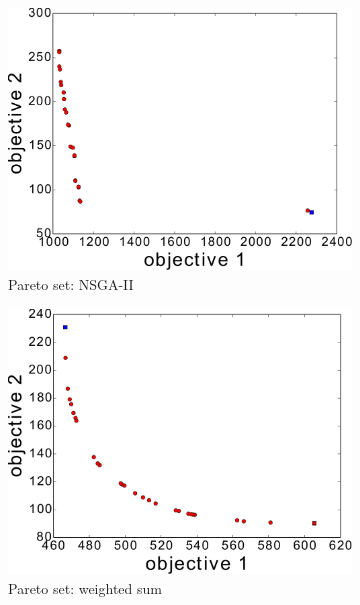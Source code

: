 \documentclass{article}
\begin{document}
\begin{figure}[h!]
\begin{subfigure}[b]{0.31\linewidth}
		\includegraphics[width=\textwidth]{fig/sim3-2obj/PF03-MOPATH.pdf}
		\caption{Pareto set: NSGA-II}
		\label{fig:sim:norm:pf:a}
	\end{subfigure}
	\begin{subfigure}[b]{0.31\linewidth}
		\centering
		\includegraphics[width=\textwidth]{fig/sim1-2obj/PF01-MORRT.pdf}
		\caption{Pareto set: weighted sum}
		\label{fig:sim:norm:pf:b}
	\end{subfigure}
	\begin{subfigure}[b]{0.31\linewidth}
		\centering

\end{subfigure}
\end{figure}
\end{document}
